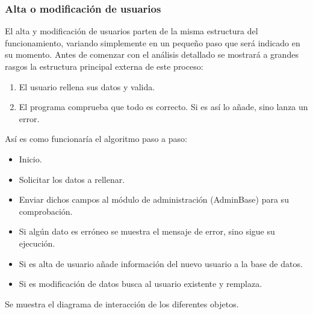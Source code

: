 \subsubsection{Alta o modificación de usuarios}
El alta y modificación de usuarios parten de la misma estructura del funcionamiento, variando simplemente en un pequeño paso que será indicado en su momento. Antes de comenzar con el análisis detallado se mostrará a grandes rasgos la estructura principal externa de este proceso:\\
\begin{enumerate}
\item El usuario rellena sus datos y valida.
\item El programa comprueba que todo es correcto. Si es así lo añade, sino lanza un error.
\end{enumerate}
Así es como funcionaría el algoritmo paso a paso:
\begin{itemize}
\item Inicio.
\item Solicitar los datos a rellenar.
\item Enviar dichos campos al módulo de administración (AdminBase) para su comprobación.
\item Si algún dato es erróneo se muestra el mensaje de error, sino sigue su ejecución.
\item Si es alta de usuario añade información del nuevo usuario a la base de datos.
\item Si es modificación de datos busca al usuario existente y remplaza.
\end{itemize}
Se muestra el diagrama de interacción de los diferentes objetos.
